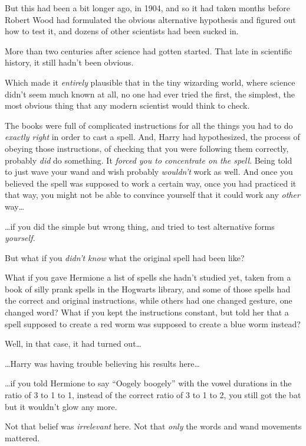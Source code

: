 But this had been a bit longer ago, in 1904, and so it had taken months
before Robert Wood had formulated the obvious alternative hypothesis and
figured out how to test it, and dozens of other scientists had been
sucked in.

More than two centuries after science had gotten started. That late in
scientific history, it still hadn't been obvious.

Which made it \emph{entirely} plausible that in the tiny wizarding
world, where science didn't seem much known at all, no one had ever
tried the first, the simplest, the most obvious thing that any modern
scientist would think to check.

The books were full of complicated instructions for all the things you
had to do \emph{exactly right} in order to cast a spell. And, Harry had
hypothesized, the process of obeying those instructions, of checking
that you were following them correctly, probably \emph{did} do
something. It \emph{forced you to concentrate on the spell}. Being told
to just wave your wand and wish probably \emph{wouldn't} work as well.
And once you believed the spell was supposed to work a certain way, once
you had practiced it that way, you might not be able to convince
yourself that it could work any \emph{other} way\ldots{}

\ldots{}if you did the simple but wrong thing, and tried to test
alternative forms \emph{yourself.}

But what if you \emph{didn't know} what the original spell had been
like?

What if you gave Hermione a list of spells she hadn't studied yet, taken
from a book of silly prank spells in the Hogwarts library, and some of
those spells had the correct and original instructions, while others had
one changed gesture, one changed word? What if you kept the instructions
constant, but told her that a spell supposed to create a red worm was
supposed to create a blue worm instead?

Well, in that case, it had turned out\ldots{}

\ldots{}Harry was having trouble believing his results here\ldots{}

\ldots{}if you told Hermione to say ``Oogely boogely'' with the vowel
durations in the ratio of 3 to 1 to 1, instead of the correct ratio of 3
to 1 to 2, you still got the bat but it wouldn't glow any more.

Not that belief was \emph{irrelevant} here. Not that \emph{only} the
words and wand movements mattered.

